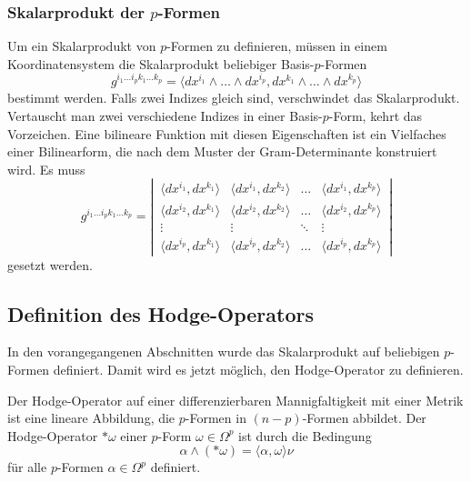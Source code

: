 %
%
\subsubsection{Skalarprodukt der $p$-Formen}
Um ein Skalarprodukt von $p$-Formen zu definieren, müssen in einem
Koordinatensystem die Skalarprodukt beliebiger Basis-$p$-Formen
\[
g^{i_1\dots i_pk_1\dots k_p}
=
\langle
dx^{i_1}\wedge\dots\wedge dx^{i_p}
,
dx^{k_1}\wedge\dots\wedge dx^{k_p}
\rangle
\]
bestimmt werden.
Falls zwei Indizes gleich sind, verschwindet das Skalarprodukt.
Vertauscht man zwei verschiedene Indizes in einer Basis-$p$-Form,
kehrt das Vorzeichen.
Eine bilineare Funktion mit diesen Eigenschaften ist ein Vielfaches
einer Bilinearform, die nach dem Muster der Gram-Determinante 
konstruiert wird.
Es muss
\[
g^{i_1\dots i_pk_1\dots k_p}
=
\left|\,
\begin{matrix}
\langle dx^{i_1}, dx^{k_1} \rangle
	&\langle dx^{i_1}, dx^{k_2} \rangle
	&\dots
	&\langle dx^{i_1}, dx^{k_p} \rangle
\\
\langle dx^{i_2}, dx^{k_1} \rangle
	&\langle dx^{i_2}, dx^{k_2} \rangle
	&\dots
	&\langle dx^{i_2}, dx^{k_p} \rangle
\\[-2pt]
\vdots
	&\vdots
	&\ddots
	&\vdots
\\
\langle dx^{i_p}, dx^{k_1} \rangle
	&\langle dx^{i_p}, dx^{k_2} \rangle
	&\dots
	&\langle dx^{i_p}, dx^{k_p} \rangle
\end{matrix}
\,\right|
\]
gesetzt werden.

%
%
\subsection{Definition des Hodge-Operators}
In den vorangegangenen Abschnitten wurde das Skalarprodukt auf
beliebigen $p$-Formen definiert.
Damit wird es jetzt möglich, den Hodge-Operator zu definieren.

\begin{definition}
\label{buch:hodge:koordinatenfrei:def:hodge-operator}
Der Hodge-Operator auf einer differenzierbaren Mannigfaltigkeit
mit einer Metrik ist eine lineare Abbildung, die $p$-Formen in
$(n-p)$-Formen abbildet.
Der Hodge-Operator $\ast\omega$ einer $p$-Form $\omega\in\Omega^p$
ist durch die Bedingung
\begin{equation}
\alpha \wedge (\ast\omega) = \langle \alpha,\omega\rangle \nu
\label{buch:hodge:koordinatenfrei:eqn:definition}
\end{equation}
für alle $p$-Formen $\alpha\in\Omega^p$ definiert.
\end{definition}

